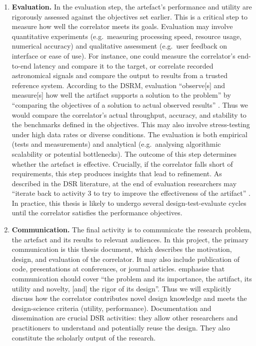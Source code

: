 \begin{enumerate}
     \item \textbf{Evaluation.} In the evaluation step, the artefact’s performance and utility are rigorously assessed against the objectives set earlier. This is a critical step to measure how well the correlator meets its goals. Evaluation may involve quantitative experiments (e.g.\ measuring processing speed, resource usage, numerical accuracy) and qualitative assessment (e.g.\ user feedback on interface or ease of use). For instance, one could measure the correlator’s end-to-end latency and compare it to the target, or correlate recorded astronomical signals and compare the output to results from a trusted reference system. According to the DSRM, evaluation “observe[s] and measure[s] how well the artifact supports a solution to the problem” by “comparing the objectives of a solution to actual observed results” \citep{Peffers2007}. Thus we would compare the correlator’s actual throughput, accuracy, and stability to the benchmarks defined in the objectives. This may also involve stress-testing under high data rates or diverse conditions. The evaluation is both empirical (tests and measurements) and analytical (e.g.\ analysing algorithmic scalability or potential bottlenecks). The outcome of this step determines whether the artefact is effective. Crucially, if the correlator falls short of requirements, this step produces insights that lead to refinement. As described in the DSR literature, at the end of evaluation researchers may “iterate back to activity 3 to try to improve the effectiveness of the artifact” \citep{Peffers2007}. In practice, this thesis is likely to undergo several design-test-evaluate cycles until the correlator satisfies the performance objectives.
 
    \item \textbf{Communication.} The final activity is to communicate the research problem, the artefact and its results to relevant audiences. In this project, the primary communication is this thesis document, which describes the motivation, design, and evaluation of the correlator. It may also include publication of code, presentations at conferences, or journal articles. \citep{Peffers2007} emphasise that communication should cover “the problem and its importance, the artifact, its utility and novelty, [and] the rigor of its design”. Thus we will explicitly discuss how the correlator contributes novel design knowledge and meets the design-science criteria (utility, performance). Documentation and dissemination are crucial DSR activities: they allow other researchers and practitioners to understand and potentially reuse the design. They also constitute the scholarly output of the research.
\end{enumerate}

